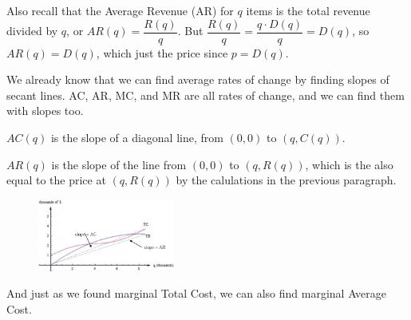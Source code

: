 Also recall that the Average Revenue (AR) for $q$ items is the total revenue divided by $q$, or $AR(q)=\dfrac{R(q)}{q}$. But $\dfrac{R(q)}{q} = \dfrac{q \cdot D(q)}{q}= D(q)$, so $AR(q)=D(q)$, which just the price since $p=D(q)$.

We already know that we can find average rates of change by finding slopes of secant lines. AC, AR, MC, and MR are all rates of change, and we can find them with slopes too.

$AC(q)$ is the slope of a diagonal line, from $(0, 0)$ to $(q,C(q))$.

$AR(q)$ is the slope of the line from $(0, 0)$ to $(q,R(q))$, which is the also equal to the price at $(q,R(q))$ by the calulations in the previous paragraph.

\begin{figure}[!ht]
  \centering
    \includegraphics[width=0.4\textwidth]{img/chap2/image113.png}
\end{figure}

And just as we found marginal Total Cost, we can also find marginal Average Cost.


